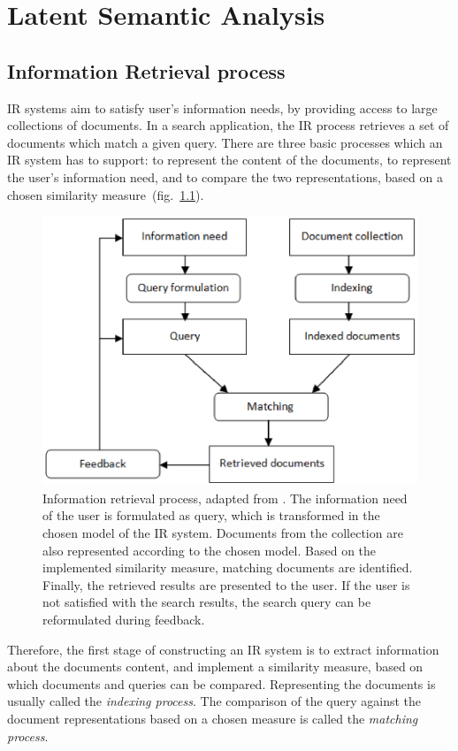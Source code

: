 \chapter{Latent Semantic Analysis}
\label{sec:lsa}

 
\section{Information Retrieval process}
\gls{IR} systems aim to satisfy user's information needs, by providing access to large collections of documents.  In a search application, the \gls{IR} process retrieves a set of documents which match a given query. There are three basic processes which an \gls{IR} system has to support: to represent the content of the documents, to represent the user's information need, and to compare the two representations, based on a chosen similarity measure~(fig.~\ref{lsa:fig:ir_process}).
%
%
\begin{figure}[htbp]
	\centering
	\includegraphics[scale=0.7]{img/IR} 
	\caption[Information Retrieval process]%
           {Information retrieval process, adapted from \cite{IRmodels09}. The information need of the user is formulated as query, which is transformed in the chosen model of the \gls{IR} system. Documents from the collection are also represented according to the chosen model. Based on the implemented similarity measure, matching documents are identified. Finally, the retrieved results are presented to the user. If the user is not satisfied with the search results, the search query can be reformulated during feedback.}
\label{lsa:fig:ir_process}
\end{figure} 
Therefore, the first stage of constructing an \gls{IR} system is to extract information about the documents content, and implement a similarity measure, based on which documents and queries can be compared. Representing the documents is usually called the \textit{indexing process}. The comparison of the query against the document representations based on a chosen measure is called the \textit{matching process}.\\

